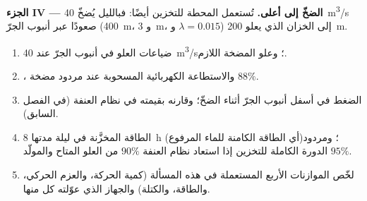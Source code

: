 \begin{problem}
\medskip
\noindent\textbf{الجزء IV --- الضخّ إلى أعلى.}
تُستعمل المحطة للتخزين أيضًا: فبالليل يُضخّ \qty{40}{m^3/s}
صعودًا عبر أنبوب الجرّ (\qty{400}{m}، و \qty{3}{m}، و $\lambda = 0.015$) إلى
الخزان الذي يعلو \qty{200}{m}.
\begin{enumerate}[resume]
  \item ضياعات العلو في أنبوب الجرّ عند \qty{40}{m^3/s}؛ وعلو المضخة اللازم.
  \item {}، والاستطاعة الكهربائية المسحوبة
        عند مردود مضخة $88\%$.
  \item الضغط في أسفل أنبوب الجرّ أثناء الضخّ؛ وقارنه
        بقيمته في نظام العنفة (في الفصل السابق).
  \item الطاقة المخزَّنة في ليلة مدتها \qty{8}{h} (أي الطاقة الكامنة
        للماء المرفوع)؛ ومردود الدورة الكاملة للتخزين إذا استعاد
        نظام العنفة $90\%$ من العلو المتاح والمولّد $95\%$.
  \item لخّص الموازنات الأربع المستعملة في هذه المسألة (كمية
        الحركة، والعزم الحركي، والطاقة، والكتلة) والجهاز الذي
        عوّلته كل منها.
\end{enumerate}
\end{problem}
